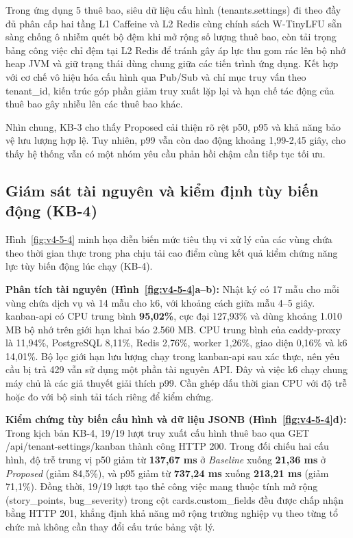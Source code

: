 Trong ứng dụng 5 thuê bao, siêu dữ liệu cấu hình (tenants.settings) đi theo đầy đủ phân cấp hai tầng L1 Caffeine và L2 Redis cùng chính sách W-TinyLFU sẵn sàng chống ô nhiễm quét bộ đệm khi mở rộng số lượng thuê bao, còn tải trọng bảng công việc chỉ đệm tại L2 Redis để tránh gây áp lực thu gom rác lên bộ nhớ heap JVM và giữ trạng thái dùng chung giữa các tiến trình ứng dụng. Kết hợp với cơ chế vô hiệu hóa cấu hình qua Pub/Sub và chỉ mục truy vấn theo tenant\_\allowbreak{}id, kiến trúc góp phần giảm truy xuất lặp lại và hạn chế tác động của thuê bao gây nhiễu lên các thuê bao khác.

Nhìn chung, KB-3 cho thấy Proposed cải thiện rõ rệt p50, p95 và khả năng bảo vệ lưu lượng hợp lệ. Tuy nhiên, p99 vẫn còn dao động khoảng 1,99-2,45 giây, cho thấy hệ thống vẫn có một nhóm yêu cầu phản hồi chậm cần tiếp tục tối ưu.

\subsection{Giám sát tài nguyên và kiểm định tùy biến động (KB-4)}\label{v4-sec-5-3-2}

Hình~\ref{fig:v4-5-4} minh họa diễn biến mức tiêu thụ vi xử lý của các vùng chứa theo thời gian thực trong pha chịu tải cao điểm cùng kết quả kiểm chứng năng lực tùy biến động lúc chạy (KB-4).

\begingroup
\renewcommand{\VfourImageMaxHeight}{.355\textheight}
\endgroup

\textbf{Phân tích tài nguyên (Hình~\ref{fig:v4-5-4}a--b):} Nhật ký có 17 mẫu cho mỗi vùng chứa dịch vụ và 14 mẫu cho k6, với khoảng cách giữa mẫu 4--5 giây. kanban-api có CPU trung bình \textbf{95,02\%}, cực đại 127,93\% và dùng khoảng 1.010 MB bộ nhớ trên giới hạn khai báo 2.560 MB. CPU trung bình của caddy-proxy là 11,94\%, PostgreSQL 8,11\%, Redis 2,76\%, worker 1,26\%, giao diện 0,16\% và k6 14,01\%. Bộ lọc giới hạn lưu lượng chạy trong kanban-api sau xác thực, nên yêu cầu bị trả 429 vẫn sử dụng một phần tài nguyên API. Đây và việc k6 chạy chung máy chủ là các giả thuyết giải thích p99. Cần ghép dấu thời gian CPU với độ trễ hoặc đo với bộ sinh tải tách riêng để kiểm chứng.

\textbf{Kiểm chứng tùy biến cấu hình và dữ liệu JSONB (Hình~\ref{fig:v4-5-4}d):} Trong kịch bản KB-4, 19/19 lượt truy xuất cấu hình thuê bao qua GET /api/tenant-settings/kanban thành công HTTP 200. Trong đối chiếu hai cấu hình, độ trễ trung vị p50 giảm từ \textbf{137,67 ms} ở \emph{Baseline} xuống \textbf{21,36 ms} ở \emph{Proposed} (giảm 84,5\%), và p95 giảm từ \textbf{737,24 ms} xuống \textbf{213,21 ms} (giảm 71,1\%). Đồng thời, 19/19 lượt tạo thẻ công việc mang thuộc tính mở rộng (story\_\allowbreak{}points, bug\_\allowbreak{}severity) trong cột cards.custom\_\allowbreak{}fields đều được chấp nhận bằng HTTP 201, khẳng định khả năng mở rộng trường nghiệp vụ theo từng tổ chức mà không cần thay đổi cấu trúc bảng vật lý.

